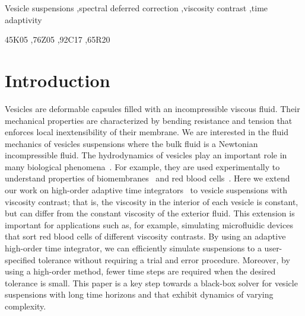 \documentclass[3p,times,procedia]{elsarticle}
\begin{document}
\begin{frontmatter}
\begin{keyword}
Vesicle suspensions \sep spectral deferred correction \sep viscosity
contrast \sep time adaptivity


\MSC 45K05 \sep 76Z05 \sep 92C17 \sep 65R20

\end{keyword}
\end{frontmatter}





\section{Introduction}
\label{s:Introduction}
Vesicles are deformable capsules filled with an incompressible viscous
fluid. Their mechanical properties are characterized by bending
resistance and tension that enforces local inextensibility of their
membrane.  We are interested in the fluid mechanics of vesicles
suspensions where the bulk fluid is a Newtonian incompressible fluid.
The hydrodynamics of vesicles play an important role in many
biological phenomena~\cite{kra:win:sei:lip1996,sei1997}.  For example,
they are used experimentally to understand properties of
biomembranes~\cite{sac1996} and red blood
cells~\cite{nog:gom2005,poz1990,ghi:rah:bir:mis2011,kao:tah:bib:ezz:ben:bir:mis2011,mis2006}.
Here we extend our work on high-order adaptive time
integrators~\cite{qua:bir2014c} to vesicle suspensions with viscosity
contrast; that is, the viscosity in the interior of each vesicle is
constant, but can differ from the constant viscosity of the exterior
fluid.  This extension is important for applications such as, for
example, simulating microfluidic devices that sort red blood cells of
different viscosity contrasts.  By using an adaptive high-order time
integrator, we can efficiently simulate suspensions to a
user-specified tolerance without requiring a trial and error
procedure.  Moreover, by using a high-order method, fewer time steps
are required when the desired tolerance is small.  This paper is a key
step towards a black-box solver for vesicle suspensions with long time
horizons and that exhibit dynamics of varying complexity.
\end{document}
